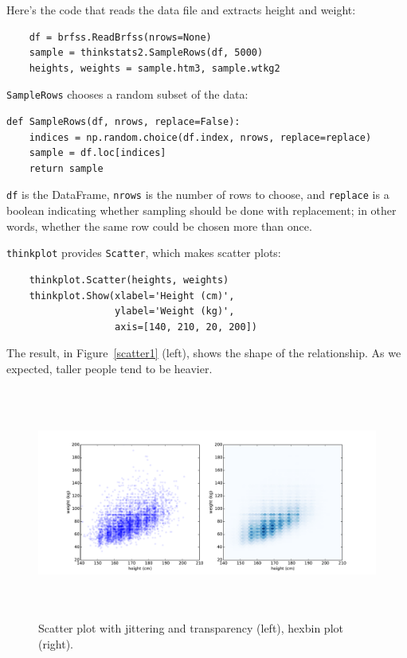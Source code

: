 \documentclass[12pt]{book}
\begin{document}
Here's the code that reads the data file and extracts height and
weight:

\begin{verbatim}
    df = brfss.ReadBrfss(nrows=None)
    sample = thinkstats2.SampleRows(df, 5000)
    heights, weights = sample.htm3, sample.wtkg2
\end{verbatim}

{\tt SampleRows} chooses a random subset of the data:

\begin{verbatim}
def SampleRows(df, nrows, replace=False):
    indices = np.random.choice(df.index, nrows, replace=replace)
    sample = df.loc[indices]
    return sample
\end{verbatim}

{\tt df} is the DataFrame, {\tt nrows} is the number of rows to choose,
and {\tt replace} is a boolean indicating whether sampling should be
done with replacement; in other words, whether the same row could be
chosen more than once.

{\tt thinkplot} provides {\tt Scatter}, which makes scatter plots:
%
\begin{verbatim}
    thinkplot.Scatter(heights, weights)
    thinkplot.Show(xlabel='Height (cm)',
                   ylabel='Weight (kg)',
                   axis=[140, 210, 20, 200])
\end{verbatim}

The result, in Figure~\ref{scatter1} (left), shows the shape of
the relationship.  As we expected, taller
people tend to be heavier.  

\begin{figure}
\centerline{\includegraphics[height=3.0in]{figs/scatter2.pdf}}
\caption{Scatter plot with jittering and transparency (left),
hexbin plot (right).}
\label{scatter2}
\end{figure}
\end{document}
